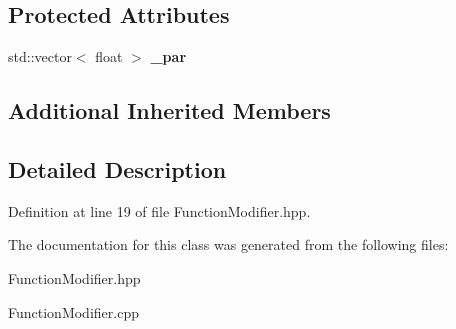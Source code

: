 \subsection*{Protected Attributes}
\begin{DoxyCompactItemize}
\item 
std\-::vector$<$ float $>$ {\bfseries \-\_\-par}\label{classdigisim_1_1FunctionModifier_a86987340330c332d2429614199bce001}

\end{DoxyCompactItemize}
\subsection*{Additional Inherited Members}


\subsection{Detailed Description}


Definition at line 19 of file Function\-Modifier.\-hpp.



The documentation for this class was generated from the following files\-:\begin{DoxyCompactItemize}
\item 
Function\-Modifier.\-hpp\item 
Function\-Modifier.\-cpp\end{DoxyCompactItemize}
